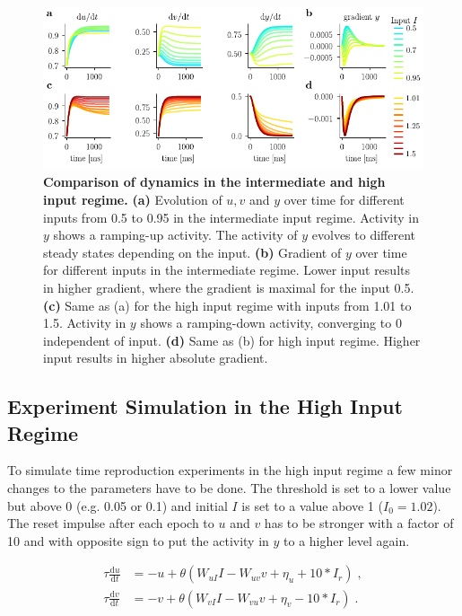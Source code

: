 \documentclass[10pt]{article}
\begin{document}
\begin{figure}[ht]
	\centering
	\includegraphics{figures/supp_regimes.pdf}
	\caption{\textbf{Comparison of dynamics in the intermediate and high input regime.} 
	\textbf{(a)} Evolution of $u, v$ and $y$ over time for different inputs from 0.5 to 0.95 in the intermediate input regime. Activity in $y$ shows a ramping-up activity. The activity of $y$ evolves to different steady states depending on the input. 
	\textbf{(b)} Gradient of $y$ over time for different inputs in the intermediate regime. Lower input results in higher gradient, where the gradient is maximal for the input 0.5.
	\textbf{(c)} Same as (a) for the high input regime with inputs from 1.01 to 1.5. Activity in $y$ shows a ramping-down activity, converging to 0 independent of input.
	\textbf{(d)} Same as (b) for high input regime. Higher input results in higher absolute gradient. 
	}
\label{regimes}
\end{figure}

\subsection{Experiment Simulation in the High Input Regime}
To simulate time reproduction experiments in the high input regime a few minor changes to the parameters have to be done. 
The threshold is set to a lower value but above 0 (e.g. 0.05 or 0.1) and initial $I$ is set to a value above 1 ($I_0 = 1.02$). The reset impulse after each epoch to $u$ and $v$ has to be stronger with a factor of 10 and with opposite sign to put the activity in $y$ to a higher level again.  

\begin{equation} \label{highI}
	\begin{split}
	\tau\frac{\text{d}u}{\text{d}t} & = -u + \theta(W_{uI}I - W_{uv}v + \eta_u + 10*I_r) \;,\\
	\tau\frac{\text{d}v}{\text{d}t} & = -v + \theta(W_{vI}I - W_{vu}v + \eta_v - 10*I_r) \;.\\
	\end{split}
\end{equation}
\end{document}
